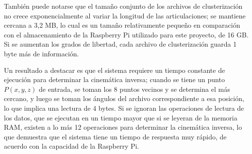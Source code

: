 También puede notarse que el tamaño conjunto de los archivos de clusterización no crece exponencialmente al variar la longitud de las articulaciones; se mantiene cercana a 3,2 MB, lo cual es un tamaño relativamente pequeño en comparación con el almacenamiento de la Raspberry Pi utilizado para este proyecto, de 16 GB. Si se aumentan los grados de libertad, cada archivo de clusterización guarda 1 byte más de información.

Un resultado a destacar es que el sistema requiere un tiempo constante de ejecución para determinar la cinemática inversa; cuando se tiene un punto $P(x,y,z)$ de entrada, se toman los 8 puntos vecinos y se determina el más cercano, y luego se toman los ángulos del archivo correspondiente a esa posición, lo que implica una lectura de 4 bytes. Si se ignoran las operaciones de lectura de los datos, que se ejecutan en un tiempo mayor que si se leyeran de la memoria RAM, existen a lo más 12 operaciones para determinar la cinemática inversa, lo que demuestra que el sistema tiene un tiempo de respuesta muy rápido, de acuerdo con la capacidad de la Raspberry Pi.